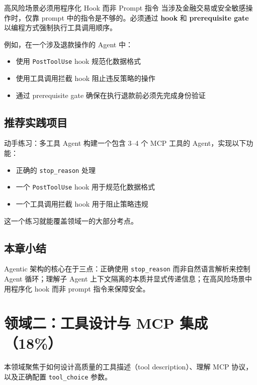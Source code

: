 \documentclass[a4paper]{article}
\begin{document}
\begin{importantbox}{高风险场景必须用程序化 Hook 而非 Prompt 指令}
当涉及金融交易或安全敏感操作时，仅靠 prompt 中的指令是不够的。必须通过 \textbf{hook} 和 \textbf{prerequisite gate} 以编程方式强制执行工具调用顺序。
\end{importantbox}

例如，在一个涉及退款操作的 Agent 中：
\begin{itemize}[leftmargin=1.5em]
    \item 使用 \texttt{PostToolUse} hook 规范化数据格式
    \item 使用工具调用拦截 hook 阻止违反策略的操作
    \item 通过 prerequisite gate 确保在执行退款前必须先完成身份验证
\end{itemize}

\subsection{推荐实践项目}

\begin{knowledgebox}{动手练习：多工具 Agent}
构建一个包含 3--4 个 MCP 工具的 Agent，实现以下功能：
\begin{itemize}[leftmargin=1.5em]
    \item 正确的 \texttt{stop\_reason} 处理
    \item 一个 \texttt{PostToolUse} hook 用于规范化数据格式
    \item 一个工具调用拦截 hook 用于阻止策略违规
\end{itemize}
这一个练习就能覆盖领域一的大部分考点。
\end{knowledgebox}

\subsection{本章小结}

Agentic 架构的核心在于三点：正确使用 \texttt{stop\_reason} 而非自然语言解析来控制 Agent 循环；理解子 Agent 上下文隔离的本质并显式传递信息；在高风险场景中用程序化 hook 而非 prompt 指令来保障安全。

\section{领域二：工具设计与 MCP 集成（18\%）}

本领域聚焦于如何设计高质量的工具描述（tool description）、理解 MCP 协议，以及正确配置 \texttt{tool\_choice} 参数。
\end{document}
